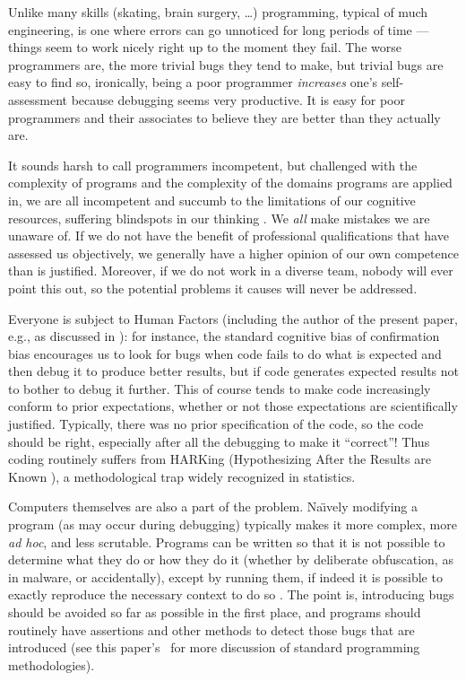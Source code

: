 \begin{change}
Unlike many skills (skating, brain surgery, \ldots) programming, typical of much engineering, is one where errors can go unnoticed for long periods of time --- things seem to work nicely right up to the moment they fail. The worse programmers are, the more trivial bugs they tend to make, but trivial bugs are easy to find so, ironically, being a poor programmer \emph{increases\/} one's self-assessment because debugging seems very productive. It is easy for poor programmers and their associates to believe they are better than they actually are. 

It sounds harsh to call programmers incompetent, but challenged with the complexity of programs and the complexity of the domains programs are applied in, we are all incompetent and succumb to the limitations of our cognitive resources, suffering blindspots in our thinking \cite{fixit}. We \emph{all\/} make mistakes we are unaware of. If we do not have the benefit of professional qualifications that have assessed us objectively, we generally have a higher opinion of our own competence than is justified. Moreover, if we do not work in a diverse team, nobody will ever point this out, so the potential problems it causes will never be addressed.

{Everyone is subject to Human Factors (including the author of the present paper, e.g., as discussed in \cite{enigma}): for instance, the standard cognitive bias of confirmation bias encourages us to look for bugs when code fails to do what is expected and then debug it to produce better results, but if code generates expected results not to bother to debug it further. This of course tends to make code increasingly conform to prior expectations, whether or not those expectations are scientifically justified. Typically, there was no prior specification of the code, so the code should be right, especially after all the debugging to make it ``correct''! Thus coding routinely suffers from HARKing (Hypothesizing After the Results are Known \cite{harking}), a methodological trap widely recognized in statistics.}

Computers themselves are also a part of the problem. Na\"\i vely modifying a program (as may occur during debugging) typically makes it more complex, more \emph{ad hoc}, and less scrutable. Programs can be written so that it is not possible to determine what they do or how they do it (whether by deliberate obfuscation, as in malware, or accidentally), except by running them, if indeed it is possible to exactly reproduce the necessary context to do so \cite{framework}. The point is, introducing bugs should be avoided so far as possible in the first place, and programs should routinely have assertions and other methods to detect those bugs that are introduced (see this paper's \supplement\ for more discussion of standard programming methodologies).
\end{change}

